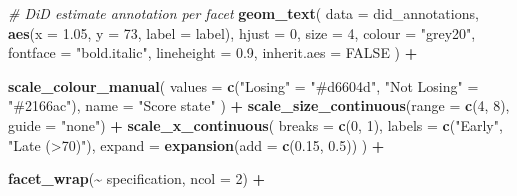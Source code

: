 \documentclass[
]{article}
\newenvironment{Shaded}{\begin{snugshade}}{\end{snugshade}}
\newcommand{\AttributeTok}[1]{\textcolor[rgb]{0.13,0.29,0.53}{#1}}
\newcommand{\CommentTok}[1]{\textcolor[rgb]{0.56,0.35,0.01}{\textit{#1}}}
\newcommand{\ConstantTok}[1]{\textcolor[rgb]{0.56,0.35,0.01}{#1}}
\newcommand{\DecValTok}[1]{\textcolor[rgb]{0.00,0.00,0.81}{#1}}
\newcommand{\FloatTok}[1]{\textcolor[rgb]{0.00,0.00,0.81}{#1}}
\newcommand{\FunctionTok}[1]{\textcolor[rgb]{0.13,0.29,0.53}{\textbf{#1}}}
\newcommand{\NormalTok}[1]{#1}
\newcommand{\OtherTok}[1]{\textcolor[rgb]{0.56,0.35,0.01}{#1}}
\newcommand{\SpecialCharTok}[1]{\textcolor[rgb]{0.81,0.36,0.00}{\textbf{#1}}}
\newcommand{\StringTok}[1]{\textcolor[rgb]{0.31,0.60,0.02}{#1}}
\begin{document}
\begin{Shaded}
\begin{Highlighting}[]
  \CommentTok{\# DiD estimate annotation per facet}
  \FunctionTok{geom\_text}\NormalTok{(}
    \AttributeTok{data =}\NormalTok{ did\_annotations,}
    \FunctionTok{aes}\NormalTok{(}\AttributeTok{x =} \FloatTok{1.05}\NormalTok{, }\AttributeTok{y =} \DecValTok{73}\NormalTok{, }\AttributeTok{label =}\NormalTok{ label),}
    \AttributeTok{hjust      =} \DecValTok{0}\NormalTok{,}
    \AttributeTok{size       =} \DecValTok{4}\NormalTok{,}
    \AttributeTok{colour     =} \StringTok{"grey20"}\NormalTok{,}
    \AttributeTok{fontface   =} \StringTok{"bold.italic"}\NormalTok{,}
    \AttributeTok{lineheight =} \FloatTok{0.9}\NormalTok{,}
    \AttributeTok{inherit.aes =} \ConstantTok{FALSE}
\NormalTok{  ) }\SpecialCharTok{+}

  \FunctionTok{scale\_colour\_manual}\NormalTok{(}
    \AttributeTok{values =} \FunctionTok{c}\NormalTok{(}\StringTok{"Losing"} \OtherTok{=} \StringTok{"\#d6604d"}\NormalTok{, }\StringTok{"Not Losing"} \OtherTok{=} \StringTok{"\#2166ac"}\NormalTok{),}
    \AttributeTok{name   =} \StringTok{"Score state"}
\NormalTok{  ) }\SpecialCharTok{+}
  \FunctionTok{scale\_size\_continuous}\NormalTok{(}\AttributeTok{range =} \FunctionTok{c}\NormalTok{(}\DecValTok{4}\NormalTok{, }\DecValTok{8}\NormalTok{), }\AttributeTok{guide =} \StringTok{"none"}\NormalTok{) }\SpecialCharTok{+}
  \FunctionTok{scale\_x\_continuous}\NormalTok{(}
    \AttributeTok{breaks =} \FunctionTok{c}\NormalTok{(}\DecValTok{0}\NormalTok{, }\DecValTok{1}\NormalTok{),}
    \AttributeTok{labels =} \FunctionTok{c}\NormalTok{(}\StringTok{"Early"}\NormalTok{, }\StringTok{"Late (\textgreater{}70\textquotesingle{})"}\NormalTok{),}
    \AttributeTok{expand =} \FunctionTok{expansion}\NormalTok{(}\AttributeTok{add =} \FunctionTok{c}\NormalTok{(}\FloatTok{0.15}\NormalTok{, }\FloatTok{0.5}\NormalTok{))}
\NormalTok{  ) }\SpecialCharTok{+}

  \FunctionTok{facet\_wrap}\NormalTok{(}\SpecialCharTok{\textasciitilde{}}\NormalTok{ specification, }\AttributeTok{ncol =} \DecValTok{2}\NormalTok{) }\SpecialCharTok{+}


\end{Highlighting}
\end{Shaded}
\end{document}
